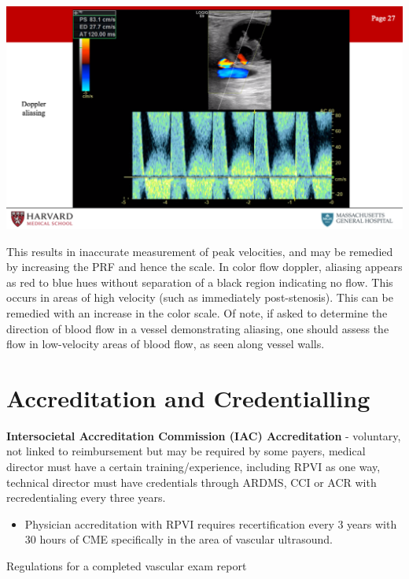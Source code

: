 \documentclass[
]{book}
\providecommand{\tightlist}{%
  \setlength{\itemsep}{0pt}\setlength{\parskip}{0pt}}
\begin{document}
\includegraphics[width=15.01in]{images/vasc_lab2/Slide28}

This results in inaccurate measurement of peak velocities, and may be
remedied by increasing the PRF and hence the scale. In color flow
doppler, aliasing appears as red to blue hues without separation of a
black region indicating no flow. This occurs in areas of high velocity
(such as immediately post-stenosis). This can be remedied with an
increase in the color scale. Of note, if asked to determine the
direction of blood flow in a vessel demonstrating aliasing, one should
assess the flow in low-velocity areas of blood flow, as seen along
vessel walls.

\hypertarget{accreditation-and-credentialling}{%
\section{Accreditation and Credentialling}\label{accreditation-and-credentialling}}

\textbf{Intersocietal Accreditation Commission (IAC) Accreditation} -
voluntary, not linked to reimbursement but may be required by some
payers, medical director must have a certain training/experience,
including RPVI as one way, technical director must have credentials
through ARDMS, CCI or ACR with recredentialing every three
years.\citep{iac2021}

\begin{itemize}
\tightlist
\item
  Physician accreditation with RPVI requires recertification every 3
  years with 30 hours of CME specifically in the area of vascular
  ultrasound.
\end{itemize}

Regulations for a completed vascular exam report\citep{iac2021}
\end{document}
